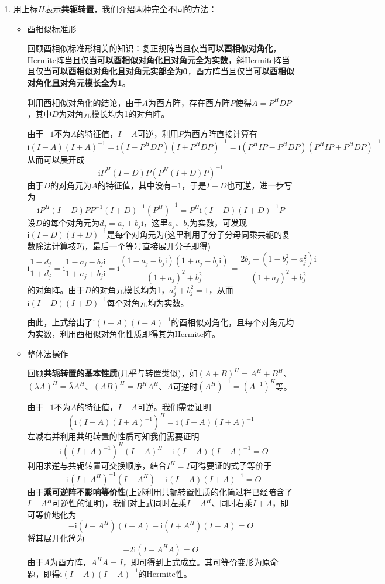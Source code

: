 \documentclass[a4paper,UTF8,fontset=windows,AutoFakeBold]{ctexart}
\newcommand*{\ir}{\mathrm{i}}
\newcommand*{\note}{\noindent *}
\begin{document}
\begin{enumerate}
    \item
    用上标$H$表示\textbf{共轭转置}，我们介绍两种完全不同的方法：
    \begin{itemize}
        \item 酉相似标准形
        
        \note 回顾酉相似标准形相关的知识：复正规阵当且仅当\textbf{可以酉相似对角化}，Hermite阵当且仅当\textbf{可以酉相似对角化且对角元全为实数}，斜Hermite阵当且仅当\textbf{可以酉相似对角化且对角元实部全为0}，酉方阵当且仅当\textbf{可以酉相似对角化且对角元模长全为1}。

        利用酉相似对角化的结论，由于$A$为酉方阵，存在酉方阵$P$使得$A=P^HDP$，其中$D$为对角元模长均为1的对角阵。

        由于$-1$不为$A$的特征值，$I+A$可逆，利用$P$为酉方阵直接计算有
        $$\ir(I-A)(I+A)^{-1}=\ir(I-P^HDP)(I+P^HDP)^{-1}=\ir(P^HIP-P^HDP)(P^HIP+P^HDP)^{-1}$$
        从而可以展开成
        $$\ir P^H(I-D)P(P^H(I+D)P)^{-1}$$
        由于$D$的对角元为$A$的特征值，其中没有$-1$，于是$I+D$也可逆，进一步写为
        $$\ir P^H(I-D)PP^{-1}(I+D)^{-1}(P^H)^{-1}=P^H\ir(I-D)(I+D)^{-1}P$$
        设$D$的每个对角元为$d_j=a_j+b_j\ir$，这里$a_j$、$b_j$为实数，可发现$\ir(I-D)(I+D)^{-1}$是每个对角元为(这里利用了分子分母同乘共轭的复数除法计算技巧，最后一个等号直接展开分子即得)
        $$\ir\frac{1-d_j}{1+d_j}=\ir\frac{1-a_j-b_j\ir}{1+a_j+b_j\ir}=\ir\frac{(1-a_j-b_j\ir)(1+a_j-b_j\ir)}{(1+a_j)^2+b_j^2}=\frac{2b_j+(1-b_j^2-a_j^2)\ir}{(1+a_j)^2+b_j^2}$$
        的对角阵。由于$D$的对角元模长均为1，$a_j^2+b_j^2=1$，从而$\ir(I-D)(I+D)^{-1}$每个对角元均为实数。

        由此，上式给出了$\ir(I-A)(I+A)^{-1}$的酉相似对角化，且每个对角元均为实数，利用酉相似对角化性质即得其为Hermite阵。

        \item 整体法操作
        
        \note 回顾\textbf{共轭转置的基本性质}(几乎与转置类似)，如$(A+B)^H=A^H+B^H$、$(\lambda A)^H=\bar{\lambda}A^H$、$(AB)^H=B^HA^H$、$A$可逆时$(A^H)^{-1}=(A^{-1})^H$等。

        由于$-1$不为$A$的特征值，$I+A$可逆。我们需要证明
        $$(\ir(I-A)(I+A)^{-1})^H=\ir(I-A)(I+A)^{-1}$$
        左减右并利用共轭转置的性质可知我们需要证明
        $$-\ir((I+A)^{-1})^H(I-A)^H-\ir(I-A)(I+A)^{-1}=O$$
        利用求逆与共轭转置可交换顺序，结合$I^H=I$可得要证的式子等价于
        $$-\ir(I+A^H)^{-1}(I-A^H)-\ir(I-A)(I+A)^{-1}=O$$
        由于\textbf{乘可逆阵不影响等价性}(上述利用共轭转置性质的化简过程已经暗含了$I+A^H$可逆性的证明)，我们对上式同时左乘$I+A^H$、同时右乘$I+A$，即可等价地化为
        $$-\ir(I-A^H)(I+A)-\ir(I+A^H)(I-A)=O$$
        将其展开化简为
        $$-2\ir(I-A^HA)=O$$
        由于$A$为酉方阵，$A^HA=I$，即可得到上式成立。其可等价变形为原命题，即得$\ir(I-A)(I+A)^{-1}$的Hermite性。
 

\end{itemize}
\end{enumerate}
\end{document}
